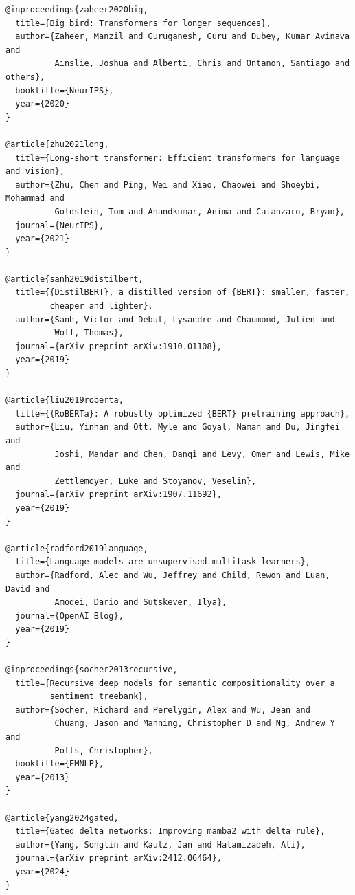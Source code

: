 \begin{lstlisting}
@inproceedings{zaheer2020big,
  title={Big bird: Transformers for longer sequences},
  author={Zaheer, Manzil and Guruganesh, Guru and Dubey, Kumar Avinava and 
          Ainslie, Joshua and Alberti, Chris and Ontanon, Santiago and others},
  booktitle={NeurIPS},
  year={2020}
}

@article{zhu2021long,
  title={Long-short transformer: Efficient transformers for language and vision},
  author={Zhu, Chen and Ping, Wei and Xiao, Chaowei and Shoeybi, Mohammad and 
          Goldstein, Tom and Anandkumar, Anima and Catanzaro, Bryan},
  journal={NeurIPS},
  year={2021}
}

@article{sanh2019distilbert,
  title={{DistilBERT}, a distilled version of {BERT}: smaller, faster, 
         cheaper and lighter},
  author={Sanh, Victor and Debut, Lysandre and Chaumond, Julien and 
          Wolf, Thomas},
  journal={arXiv preprint arXiv:1910.01108},
  year={2019}
}

@article{liu2019roberta,
  title={{RoBERTa}: A robustly optimized {BERT} pretraining approach},
  author={Liu, Yinhan and Ott, Myle and Goyal, Naman and Du, Jingfei and 
          Joshi, Mandar and Chen, Danqi and Levy, Omer and Lewis, Mike and 
          Zettlemoyer, Luke and Stoyanov, Veselin},
  journal={arXiv preprint arXiv:1907.11692},
  year={2019}
}

@article{radford2019language,
  title={Language models are unsupervised multitask learners},
  author={Radford, Alec and Wu, Jeffrey and Child, Rewon and Luan, David and 
          Amodei, Dario and Sutskever, Ilya},
  journal={OpenAI Blog},
  year={2019}
}

@inproceedings{socher2013recursive,
  title={Recursive deep models for semantic compositionality over a 
         sentiment treebank},
  author={Socher, Richard and Perelygin, Alex and Wu, Jean and 
          Chuang, Jason and Manning, Christopher D and Ng, Andrew Y and 
          Potts, Christopher},
  booktitle={EMNLP},
  year={2013}
}

@article{yang2024gated,
  title={Gated delta networks: Improving mamba2 with delta rule},
  author={Yang, Songlin and Kautz, Jan and Hatamizadeh, Ali},
  journal={arXiv preprint arXiv:2412.06464},
  year={2024}
}
\end{lstlisting}


